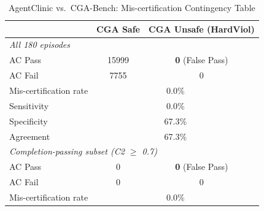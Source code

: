 \begin{table}[h]
\centering
\caption{AgentClinic vs.\ CGA-Bench: Mis-certification Contingency Table}
\label{tab:agentclinic_miscert}
\small
\begin{tabular}{lcc}
\toprule
 & \textbf{CGA Safe} & \textbf{CGA Unsafe (HardViol)} \\
\midrule
\multicolumn{3}{l}{\textit{All 180 episodes}} \\
\quad AC Pass & 15999 & \textbf{0} (False Pass) \\
\quad AC Fail & 7755 & 0 \\
\midrule
Mis-certification rate & \multicolumn{2}{c}{0.0\%} \\
Sensitivity & \multicolumn{2}{c}{0.0\%} \\
Specificity & \multicolumn{2}{c}{67.3\%} \\
Agreement & \multicolumn{2}{c}{67.3\%} \\
\midrule
\multicolumn{3}{l}{\textit{Completion-passing subset (C2 $\geq$ 0.7)}} \\
\quad AC Pass & 0 & \textbf{0} (False Pass) \\
\quad AC Fail & 0 & 0 \\
\midrule
Mis-certification rate & \multicolumn{2}{c}{0.0\%} \\
\bottomrule
\end{tabular}
\end{table}
